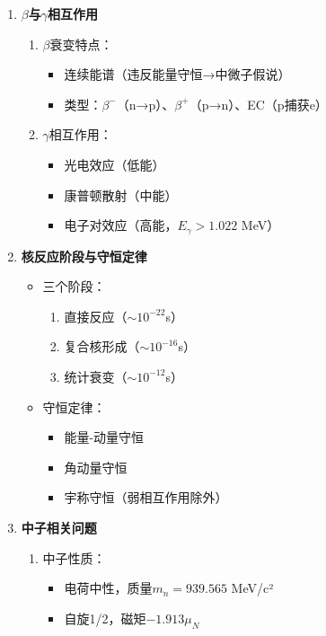 \documentclass{article}
\begin{document}
\begin{enumerate}
  \item \textbf{$\beta$与$\gamma$相互作用}
  \begin{enumerate}
    \item $\beta$衰变特点：
    \begin{itemize}
      \item 连续能谱（违反能量守恒→中微子假说）
      \item 类型：$\beta^-$（n→p）、$\beta^+$（p→n）、EC（p捕获e）
    \end{itemize}
    
    \item $\gamma$相互作用：
    \begin{itemize}
      \item 光电效应（低能）
      \item 康普顿散射（中能）
      \item 电子对效应（高能，$E_\gamma > 1.022$ MeV）
    \end{itemize}
  \end{enumerate}

  \item \textbf{核反应阶段与守恒定律}
  \begin{itemize}
    \item 三个阶段：
    \begin{enumerate}
      \item 直接反应（$\sim10^{-22}$s）
      \item 复合核形成（$\sim10^{-16}$s）
      \item 统计衰变（$\sim10^{-12}$s）
    \end{enumerate}
    
    \item 守恒定律：
    \begin{itemize}
      \item 能量-动量守恒
      \item 角动量守恒
      \item 宇称守恒（弱相互作用除外）
    \end{itemize}
  \end{itemize}

  \item \textbf{中子相关问题}
  \begin{enumerate}
    \item 中子性质：
    \begin{itemize}
      \item 电荷中性，质量$m_n = 939.565$ MeV/c²
      \item 自旋1/2，磁矩$-1.913\mu_N$
    \end{itemize}
    

\end{enumerate}
\end{enumerate}
\end{document}
